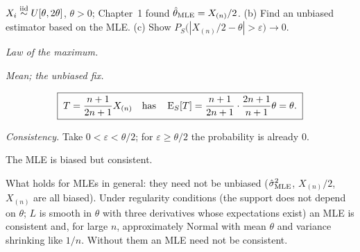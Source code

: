 \begin{example}
$X_i\overset{\text{iid}}{\sim} U[\theta,2\theta]$, $\theta>0$; Chapter~1 found $\hat\theta_{\mathrm{MLE}}=X_{(n)}/2$. (b) Find an unbiased estimator based on the MLE. (c) Show $P_S\big(|X_{(n)}/2-\theta|>\varepsilon\big)\to0$.
\begin{steps}
  \item \emph{Law of the maximum.}
  \begin{deriv}
  \end{deriv}
  \item \emph{Mean; the unbiased fix.}
  \begin{deriv}
  \end{deriv}
  \[
    \boxed{\;T=\frac{n+1}{2n+1}X_{(n)}\quad\text{has}\quad\operatorname{E}_S[T]=\frac{n+1}{2n+1}\cdot\frac{2n+1}{n+1}\theta=\theta.\;}
  \]
  \item \emph{Consistency.} Take $0<\varepsilon<\theta/2$; for $\varepsilon\ge\theta/2$ the probability is already $0$.
  \begin{deriv}
  \end{deriv}
\end{steps}
The MLE is biased but consistent.
\end{example}

What holds for MLEs in general: they need not be unbiased ($\hat\sigma^2_{\mathrm{MLE}}$, $X_{(n)}/2$, $X_{(n)}$ are all biased). Under regularity conditions (the support does not depend on $\theta$; $L$ is smooth in $\theta$ with three derivatives whose expectations exist) an MLE is consistent and, for large $n$, approximately Normal with mean $\theta$ and variance shrinking like $1/n$. Without them an MLE need not be consistent.

